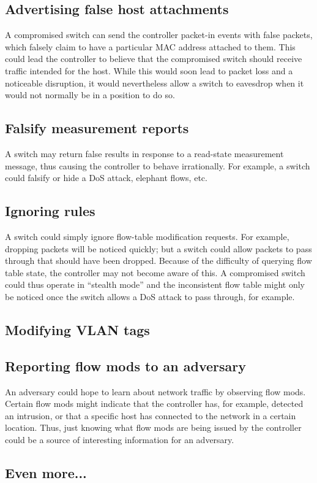 \subsection{Advertising false host attachments}
A compromised switch can send the controller packet-in events with false packets, which falsely claim to have a particular MAC address attached to them. This could lead the controller to believe that the compromised switch should receive traffic intended for the host. While this would soon lead to packet loss and a noticeable disruption, it would nevertheless allow a switch to eavesdrop when it would not normally be in a position to do so.

\subsection{Falsify measurement reports}
A switch may return false results in response to a read-state  measurement message, thus causing the controller to behave irrationally. For example, a switch could falsify or hide a DoS attack, elephant flows, etc.

\subsection{Ignoring rules}
A switch could simply ignore flow-table modification requests. For example, dropping packets will be noticed quickly; but a switch could allow packets to pass through that should have been dropped. Because of the difficulty of querying flow table state, the controller may not become aware of this. A compromised switch could thus operate in “stealth mode” and the inconsistent flow table might only be noticed once the switch allows a DoS attack to pass through, for example.

\subsection{Modifying VLAN tags}

\subsection{Reporting flow mods to an adversary}
An adversary could hope to learn about network traffic by observing flow mods. Certain flow mods might indicate that the controller has, for example, detected an intrusion, or that a specific host has connected to the network in a certain location. Thus, just knowing what flow mods are being issued by the controller could be a source of interesting information for an adversary.

\subsection{Even more...}
